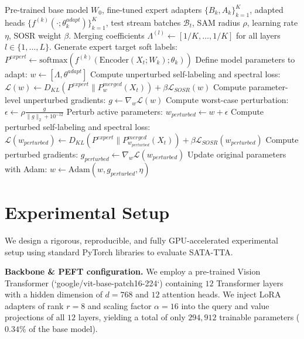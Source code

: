 \documentclass{article}
\theoremstyle{plain}
\theoremstyle{definition}
\theoremstyle{remark}
\begin{document}
\begin{algorithm}[tb]
   \caption{Sharpness-Aware Test-Time Adaptation (SATA-TTA)}
   \label{alg:sata-tta}
\begin{algorithmic}[1]
    Pre-trained base model $W_0$, fine-tuned expert adapters $\{B_k, A_k\}_{k=1}^K$, adapted heads $\{f^{(k)}(\cdot; \theta_k^{adapt})\}_{k=1}^K$, test stream batches $\mathcal{B}_t$, SAM radius $\rho$, learning rate $\eta$, SOSR weight $\beta$.
    Merging coefficients $\Lambda^{(l)} \leftarrow [1/K, \dots, 1/K]$ for all layers $l \in \{1, \dots, L\}$.
   \STATE Generate expert target soft labels:
   \STATE $P^{expert} \leftarrow \text{softmax}(f^{(k)}(\text{Encoder}(X_t; W_k); \theta_k))$
   \STATE Define model parameters to adapt: $w \leftarrow [\Lambda, \theta^{adapt}]$
   \STATE Compute unperturbed self-labeling and spectral loss:
   \STATE $\mathcal{L}(w) \leftarrow D_{KL}(P^{expert} \parallel P^{merged}_w(X_t)) + \beta \mathcal{L}_{SOSR}(w)$
   \STATE Compute parameter-level unperturbed gradients:
   \STATE $g \leftarrow \nabla_w \mathcal{L}(w)$
   \STATE Compute worst-case perturbation:
   \STATE $\epsilon \leftarrow \rho \frac{g}{\|g\|_2 + 10^{-12}}$
   \STATE Perturb active parameters: $w_{perturbed} \leftarrow w + \epsilon$
   \STATE Compute perturbed self-labeling and spectral loss:
   \STATE $\mathcal{L}(w_{perturbed}) \leftarrow D_{KL}(P^{expert} \parallel P^{merged}_{w_{perturbed}}(X_t)) + \beta \mathcal{L}_{SOSR}(w_{perturbed})$
   \STATE Compute perturbed gradients:
   \STATE $g_{perturbed} \leftarrow \nabla_w \mathcal{L}(w_{perturbed})$
   \STATE Update original parameters with Adam:
   \STATE $w \leftarrow \text{Adam}(w, g_{perturbed}, \eta)$
   \ENDFOR
\end{algorithmic}
\end{algorithm}

\section{Experimental Setup}
\label{submission-experiments}

We design a rigorous, reproducible, and fully GPU-accelerated experimental setup using standard PyTorch libraries to evaluate SATA-TTA.

\textbf{Backbone \& PEFT configuration.} We employ a pre-trained Vision Transformer (`google/vit-base-patch16-224`) containing $12$ Transformer layers with a hidden dimension of $d=768$ and $12$ attention heads. We inject LoRA adapters of rank $r=8$ and scaling factor $\alpha=16$ into the query and value projections of all $12$ layers, yielding a total of only $294,912$ trainable parameters ($0.34\%$ of the base model).
\end{document}
